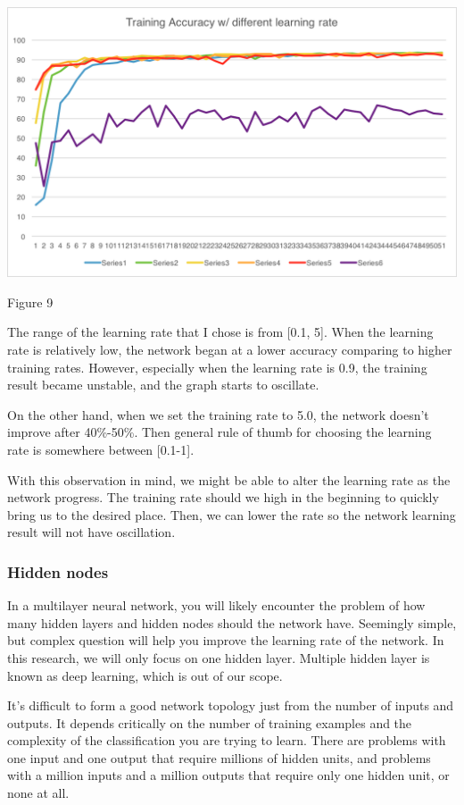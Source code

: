 \documentclass[]{article}
\begin{document}
\begin{multicols}{2}
\centerline{\includegraphics[width=1\linewidth]{graph5}}
\centerline{Figure 9}
\vspace{0.3cm}

The range of the learning rate that I chose is from [0.1, 5]. When the learning rate is relatively low, the network began at a lower accuracy comparing to higher training rates. However, especially when the learning rate is 0.9, the training result became unstable, and the graph starts to oscillate. 

On the other hand, when we set the training rate to 5.0, the network doesn't improve after 40\%-50\%. Then general rule of thumb for choosing the learning rate is somewhere between [0.1-1]. 

With this observation in mind, we might be able to alter the learning rate as the network progress. The training rate should we high in the beginning to quickly bring us to the desired place. Then, we can lower the rate so the network learning result will not have oscillation. 
 
\subsubsection{Hidden nodes}
In a multilayer neural network, you will likely encounter the problem of how many hidden layers and hidden nodes should the network have. Seemingly simple, but complex question will help you improve the learning rate of the network. In this research, we will only focus on one hidden layer. Multiple hidden layer is known as deep learning, which is out of our scope. 

It's difficult to form a good network topology just from the number of inputs and outputs. It depends critically on the number of training examples and the complexity of the classification you are trying to learn. There are problems with one input and one output that require millions of hidden units, and problems with a million inputs and a million outputs that require only one hidden unit, or none at all.


\end{multicols}
\end{document}
